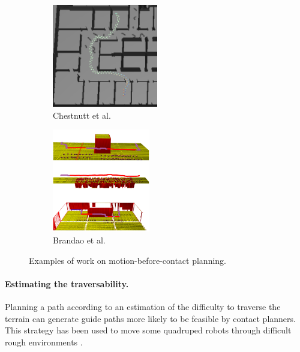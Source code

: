 \begin{figure}[ht]
    \centering
    \captionsetup[subfigure]{justification=centering}
    \begin{subfigure}[t]{0.48\linewidth}
    \includegraphics[width=\textwidth,height=4.5cm]{Figures/Chapter_SOTA//chestnutt_2004.png}
    \caption{Chestnutt et al. \cite{chestnutt_tiered_planning_2004}}
    \label{fig:cp_mbc_works_0}
    \end{subfigure}
    \begin{subfigure}[t]{0.48\linewidth}
    \includegraphics[width=\textwidth,height=4.5cm]{Figures/Chapter_SOTA//brandao_traversability.png}
    \caption{Brandao et al. \cite{brandao_multimode_2019}}
    \label{fig:cp_mbc_works_1}
    \end{subfigure}
    \caption{Examples of work on motion-before-contact planning.}
\end{figure}

\paragraph{Estimating the traversability.}
Planning a path according to an estimation of the difficulty to traverse the terrain can generate guide paths more likely to be feasible by contact planners.
This strategy has been used to move some quadruped robots through difficult rough environments \cite{kolter_2008, terrain_map_mrinal_2011, winkler_2014, winkler_carlos_2015, wermelinger_2016}. 

